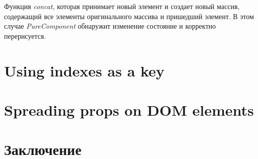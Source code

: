 Функция \textit{concat}, которая принимает новый элемент и создает новый массив, содержащий все элементы оригинального массива и пришедший элемент. В этом случае \textit{PureComponent} обнаружит изменение состояние и корректно перерисуется.

\section{Using indexes as a key}

\section{Spreading props on DOM elements}

\section{Заключение}
